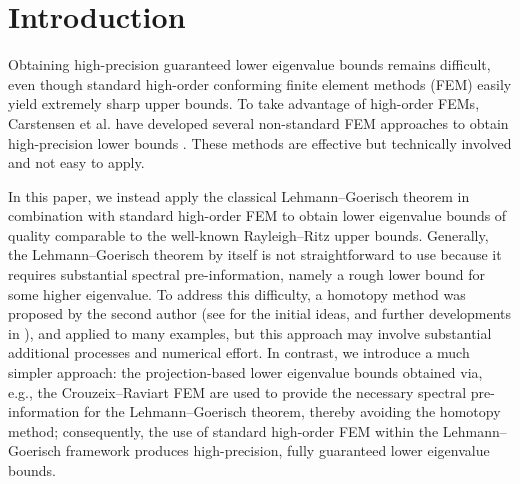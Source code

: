 \documentclass[a4,11pt]{article}
\numberwithin{equation}{section}
\begin{document}
\section{Introduction}

\medskip


Obtaining high-precision guaranteed lower eigenvalue bounds remains difficult, even though standard high-order conforming finite element methods (FEM) easily yield extremely sharp upper bounds.
To take advantage of high-order FEMs, Carstensen et al. have developed several non-standard FEM approaches to obtain high-precision lower bounds \cite{carstensen2020skeletal,carstensen2021guaranteed,carstensen2023direct}. These methods are effective but technically involved and not easy to apply.

In this paper, we instead apply the classical Lehmann--Goerisch theorem in combination with standard high-order FEM to obtain lower eigenvalue bounds of quality comparable to the well-known Rayleigh--Ritz upper bounds. Generally, the Lehmann--Goerisch theorem by itself is not straightforward to use because it requires substantial spectral pre-information, namely a rough lower bound for some higher eigenvalue. 
To address this difficulty, a homotopy method was proposed by the second author (see \cite{plum1990eigenvalue,plum1991bounds} for the initial ideas, and further developments in \cite[Chapter 10]{nakao2019numerical_book}), and applied to many examples, but this approach may involve substantial additional processes and numerical effort. 
In contrast, we introduce a much simpler approach: the projection-based lower eigenvalue bounds obtained via, e.g., the Crouzeix--Raviart FEM are used to provide the necessary spectral pre-information for the Lehmann–Goerisch theorem, thereby avoiding the homotopy method; consequently, the use of standard high-order FEM within the Lehmann--Goerisch framework produces high-precision, fully guaranteed lower eigenvalue bounds.
\end{document}
